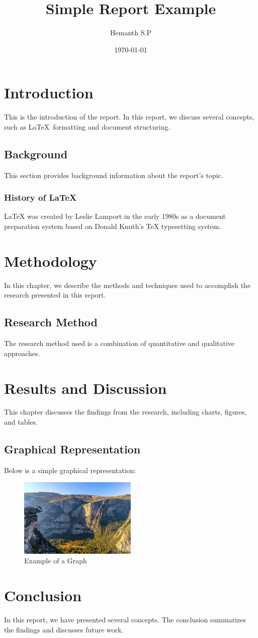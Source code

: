 \documentclass[a4paper, 12pt]{report}
\title{Simple Report Example}
\author{Hemanth S.P}
\date{\today}
\begin{document}
\maketitle  

\tableofcontents  

\chapter{Introduction}  
This is the introduction of the report. In this report, we discuss several concepts, such as \LaTeX\ formatting and document structuring.

\section{Background}  
This section provides background information about the report's topic.

\subsection{History of LaTeX}  
LaTeX was created by Leslie Lamport in the early 1980s as a document preparation system based on Donald Knuth's TeX typesetting system.

\chapter{Methodology}  
In this chapter, we describe the methods and techniques used to accomplish the research presented in this report.

\section{Research Method}  
The research method used is a combination of quantitative and qualitative approaches.

\chapter{Results and Discussion} 
This chapter discusses the findings from the research, including charts, figures, and tables.

\section{Graphical Representation}  
Below is a simple graphical representation:

\begin{figure}[h]  
\centering
\includegraphics[width=0.5\textwidth]{image2.jpg}  
\caption{Example of a Graph}
\end{figure}

\chapter{Conclusion} 
In this report, we have presented several concepts. The conclusion summarizes the findings and discusses future work.
\end{document}
